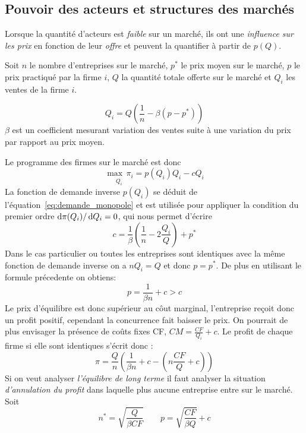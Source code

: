 

\subsection{Pouvoir des acteurs et structures des marchés} %
\label{sec:pouvoir_des_acteurs_et_structures_des_marches}

Lorsque la quantité d'acteurs est \emph{faible} sur un marché, 
ils ont une \emph{influence sur les prix} en fonction de leur \emph{offre} 
et peuvent la quantifier à partir de $p(Q)$. \vspace{1.5\baselineskip}

\begin{tcolorbox}[title=Concurrence monopolistique]
  Soit $n$ le nombre d'entreprises sur le marché, $p^*$ le prix moyen sur le marché,
  $p$ le prix practiqué par la firme $i$, $Q$ la quantité totale offerte sur le marché 
  et $Q_i$ les ventes de la firme $i$.
  
  \begin{equation}
  	Q_i= Q\left(\frac{1}{n}-\beta (p-p^*)\right)
    \label{eq:demande_monopole}
  \end{equation}
  $\beta$ est un coefficient mesurant variation des ventes 
  suite à une variation du prix par rapport au prix moyen.
  
  Le programme des firmes sur le marché est donc
  \[
  	\underset{Q_i}{\max \, \pi_i}= p(Q_i)Q_i - c Q_i
  \]
  La fonction de demande inverse $p(Q_i)$ se déduit de l'équation~\ref{eq:demande_monopole}
  et est utilisée pour appliquer la condition du premier ordre $\operatorname{d}\! \pi(Q_i)/ \operatorname{d}\! Q_i = 0$,
  qui nous permet d'écrire
  \[
  	c= \frac{1}{\beta}\left(\frac{1}{n}-2\frac{Q_i}{Q}\right)+p^*
  \]
  Dans le cas particulier ou toutes les entreprises sont identiques 
  avec la même fonction de demande inverse on a $nQ_i=Q$ et donc $p=p^*$. 
  De plus en utilisant le formule précedente on obtiens:
  \[
  	p=\frac{1}{\beta n}+c >c 
  \]
  Le prix d'équilibre est donc supérieur au côut marginal, 
  l'entreprise reçoit donc un profit positif, cependant la concurrence fait baisser le prix. 
  On pourrait de plus envisager la présence de coûts fixes CF, $CM=\frac{CF}{Q_i}+c$. 
  Le profit de chaque firme si elle sont identiques s'écrit donc :
  \[
  	\pi = \frac{Q}{n} \left( \frac{1}{\beta n}+c- \left( n\frac{CF}{Q}+c \right) \right)
  \]
  Si on veut analyser \emph{l'équilibre de long terme} 
  il faut analyser la situation \emph{d'annulation du profit} 
  dans laquelle plus aucune entreprise entre sur le marché.
  Soit
  \[
  	n^* = \sqrt{\frac{Q}{\beta CF}} \qquad p=\sqrt{\frac{CF}{\beta Q}}+c
  \]
\end{tcolorbox}

